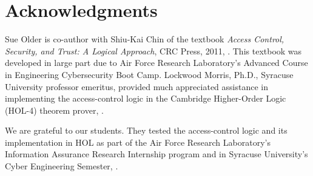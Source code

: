 \chapter*{Acknowledgments}

Sue Older is co-author with Shiu-Kai Chin of the textbook \emph{Access
  Control, Security, and Trust: A Logical Approach}, CRC Press, 2011,
\cite{ACST}. This textbook was developed in large part due to Air
Force Research Laboratory's Advanced Course in Engineering
Cybersecurity Boot Camp. Lockwood Morris, Ph.D., Syracuse University
professor emeritus, provided much appreciated assistance in
implementing the access-control logic in the Cambridge Higher-Order
Logic (HOL-4) theorem prover, \cite{HOL}.

We are grateful to our students. They tested the access-control logic
and its implementation in HOL as part of the Air Force Research
Laboratory's Information Assurance Research Internship program and in
Syracuse University's Cyber Engineering Semester, \cite{OC12}.

